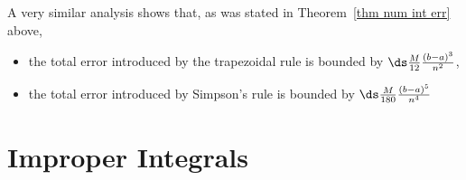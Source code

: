 \begin{comment}
&=\tfrac{M}{6}\Big[\big(x_1-\bar x_1\big)^3
                     -\big(x_0-\bar x_1\big)^3\Big]
=\tfrac{M}{6}\Big[\big(\tfrac{\De x}{2}\big)^3
                     -\big(-\tfrac{\De x}{2}\big)^3\Big]\\
&=\tfrac{M}{24}(\De x)^3
\end{align*}
This is a bound on the error introduced by the midpoint rule in a single
step. When there are $n$ steps, $\De x=\tfrac{b-a}{n}$ so that the error
introduced in a single step is bounded by $\tfrac{M}{24}\big(\tfrac{b-a}{n}\big)^3$
and the  total error, introduced in all $n$ steps, is bounded by
\begin{equation*}
\bigg|\int_{a}^{b}f( x)\,\dee{x}
-[f(\bar x_1)+\cdots+f(\bar x_n)]\De x\bigg|\le
n\tfrac{M}{24}\big(\tfrac{b-a}{n}\big)^3
=\hbox{$\tfrac{M}{24}\tfrac{(b-a)^3}{n^2}$}
\end{equation*}
We have just shown that, if $|f''(x)|\le M$ for all $x$ in the domain of
integration, then
\begin{equation*}
\hbox{the total error introduced by the midpoint rule is bounded by
$\tfrac{M}{24}\tfrac{(b-a)^3}{n^2}$}
\end{equation*}
\end{comment}

A very similar analysis shows that, as was stated in Theorem~\ref{thm num int err}
above,
\begin{itemize}
 \item the total error introduced by the trapezoidal rule is bounded by
$\ds \frac{M}{12}\frac{(b-a)^3}{n^2}$,
\item the total error introduced by Simpson's rule is bounded by
$\ds \frac{M}{180}\frac{(b-a)^5}{n^4}$
\end{itemize}

\section{Improper Integrals}\label{sec improp int}
